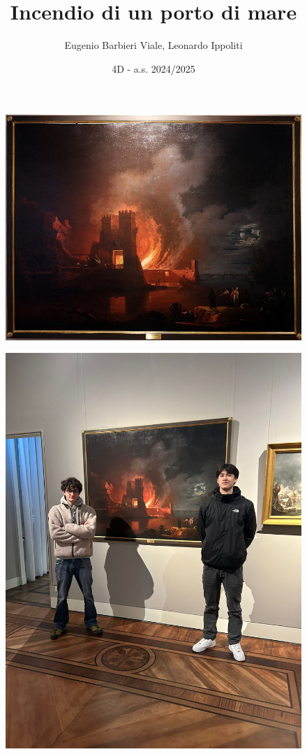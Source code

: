 \documentclass{article}
\title{Incendio di un porto di mare}
\author{Eugenio Barbieri Viale, Leonardo Ippoliti}
\date{4D - a.s. 2024/2025}
\begin{document}
\setlength{\parindent}{0pt}
\maketitle

\begin{figure}[h]
    \includegraphics[scale=0.5]{dipinto1}
    \centering
\end{figure}

\begin{figure}[h]
    \includegraphics[scale=0.05]{selfie}
    \centering
\end{figure}
\end{document}
